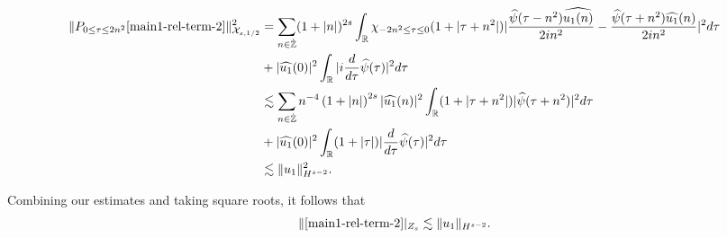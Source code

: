 \documentclass[12pt,reqno]{amsart}
\numberwithin{equation}{section}  %
\renewcommand{\cref}{\Cref}
\newcommand{\rr}{\mathbb{R}}
\newcommand{\zz}{\mathbb{Z}}
\newcommand{\zzdot}{\dot{\zz}}
\newcommand{\wh}{\widehat}
\begin{document}
\begin{equation*}
  \begin{split}
    \| P_{0 \le  \tau  \le  2n^{2}}\cref{main1-rel-term-2} \|_{\mathcal{X}_{s,1/2}}^{2} 
    & = \sum_{n \in \zzdot} (1 + |n|)^{2s} \int_{\rr}  \chi_{-2n^{2} \le \tau \le 0}(1 + | \tau + n^{2} |) | \frac{\wh{\psi}(\tau - n^{2})\wh{u_{1}(n)}}{2i
    n^{2}} -
    \frac{\wh{\psi}(\tau + n^{2})\wh{u_{1}}(n)}{2i n^{2}} |^{2} d \tau
    \\
    & + |\wh{u_{1}}(0)|^{2} \int_{\rr} | i \frac{d}{d \tau}
    \wh{\psi}(\tau)|^{2} d \tau
    \\
    & \lesssim \sum_{n \in \dot{\zz}} n^{-4} \left( 1 + |n| \right)^{2s} | \wh{u_{1}}(n)
    |^{2} \int_{\rr}  (1 + | \tau + n^{2} |) | \wh{\psi}(\tau + n^{2}) |^{2} d \tau
    \\
    & + |\wh{u_{1}}(0)|^{2} \int_{\rr} (1 + | \tau |) |\frac{d}{d \tau}
    \wh{\psi}(\tau)|^2 d \tau
    \\
    & \lesssim \| u_{1} \|_{H^{s-2}}^{2}.
\end{split}
\end{equation*}

%
Combining our estimates and taking square roots, it follows that
%
\begin{equation}
  \label{u-1-est}
  \begin{split}
    \|\cref{main1-rel-term-2}|_{Z_{s}} \lesssim 
    \|u_{1}\|_{H^{s-2}}.
  \end{split}
\end{equation}
%
%
%
%
\end{document}
